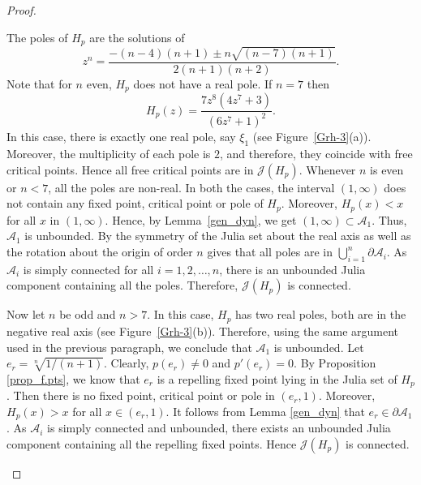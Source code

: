 \documentclass[12pt]{article}
\begin{document}
\begin{proof}
\begin{enumerate}
The poles of $H_p$ are the solutions of
$$
z^{n}=\frac{-(n-4)(n+1) \pm n \sqrt{(n-7)(n+1)}}{2(n+1)(n+2)}.
$$
Note that for $n$ even, $H_p$ does not have a real pole. If $n=7$ then
$$
H_{p}(z)=\frac{7 z^{8}\left(4 z^{7}+3\right)}{\left(6 z^{7}+1\right)^{2}}.
$$
In this case, there is exactly one real pole, say $\xi_1$ (see Figure~\ref{Grh-3}(a)). Moreover, the multiplicity of each pole is $2$, and therefore, they coincide with free critical points. Hence all free critical points are in $ \mathcal{J} (H_p) $.
Whenever $n$ is even or $n<7$, all the poles are non-real.
In both the cases, the interval $(1, \infty)$ does not contain any fixed point, critical point or pole of $ H_p $. Moreover, $H_{p}(x)<x$ for all $x$ in $(1, \infty)$. Hence, by Lemma~\ref{gen_dyn}, we get $(1, \infty) \subset \mathcal{A}_{1}$. Thus, $\mathcal{A}_{1}$ is unbounded.
By the symmetry of the Julia set about the real axis as well as the rotation about the origin of order $n$ gives that all poles are in $\bigcup_{i=1}^{n} \partial \mathcal{A}_{i}$. As $\mathcal{A}_i$ is simply connected for all $i=1,2,\dots, n$, there is an unbounded Julia component containing all the poles. Therefore, $ \mathcal{J}(H_p) $ is connected.
\par
Now let $n$ be odd and $n>7$. In this case, $H_{p}$ has two real poles, both are in the negative real axis (see Figure~\ref{Grh-3}(b)). Therefore, using the same argument used in the previous paragraph, we conclude that $\mathcal{A}_{1}$ is unbounded.
Let $e_r=\sqrt[n]{1/(n+1)}$. Clearly, $p(e_r)\neq0$ and $p'(e_r)=0$.
By Proposition \ref{prop_f.pts}, we know that $e_r$ is a repelling fixed point lying in the Julia set of $H_p$.
Then there is no fixed point, critical point or pole in $ (e_r, 1) $. Moreover, $H_{p}(x)>x$ for all $x \in(e_r, 1)$. It follows from Lemma \ref{gen_dyn} that $e_{r} \in \partial \mathcal{A}_{1}$. As $\mathcal{A}_{i}$ is simply connected and unbounded, there exists an unbounded Julia component containing all the repelling fixed points. Hence $ \mathcal{J} (H_p) $ is connected.

\end{enumerate}
\end{proof}
\end{document}
